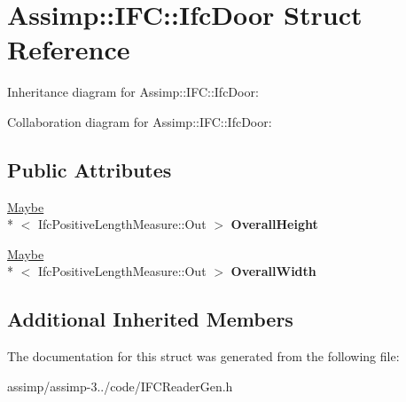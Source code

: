 \hypertarget{struct_assimp_1_1_i_f_c_1_1_ifc_door}{\section{Assimp\+:\+:I\+F\+C\+:\+:Ifc\+Door Struct Reference}
\label{struct_assimp_1_1_i_f_c_1_1_ifc_door}
}


Inheritance diagram for Assimp\+:\+:I\+F\+C\+:\+:Ifc\+Door\+:


Collaboration diagram for Assimp\+:\+:I\+F\+C\+:\+:Ifc\+Door\+:
\subsection*{Public Attributes}
\begin{DoxyCompactItemize}
\item 
\hypertarget{struct_assimp_1_1_i_f_c_1_1_ifc_door_ad0d1c3b6c69f20fc610d5f742576a054}{\hyperlink{struct_assimp_1_1_s_t_e_p_1_1_maybe}{Maybe}\\*
$<$ Ifc\+Positive\+Length\+Measure\+::\+Out $>$ {\bfseries Overall\+Height}}\label{struct_assimp_1_1_i_f_c_1_1_ifc_door_ad0d1c3b6c69f20fc610d5f742576a054}

\item 
\hypertarget{struct_assimp_1_1_i_f_c_1_1_ifc_door_a5fa60ea23ccb59a7fe9d59923a9acdbf}{\hyperlink{struct_assimp_1_1_s_t_e_p_1_1_maybe}{Maybe}\\*
$<$ Ifc\+Positive\+Length\+Measure\+::\+Out $>$ {\bfseries Overall\+Width}}\label{struct_assimp_1_1_i_f_c_1_1_ifc_door_a5fa60ea23ccb59a7fe9d59923a9acdbf}

\end{DoxyCompactItemize}
\subsection*{Additional Inherited Members}


The documentation for this struct was generated from the following file\+:\begin{DoxyCompactItemize}
\item 
assimp/assimp-\/3../code/I\+F\+C\+Reader\+Gen.\+h\end{DoxyCompactItemize}
